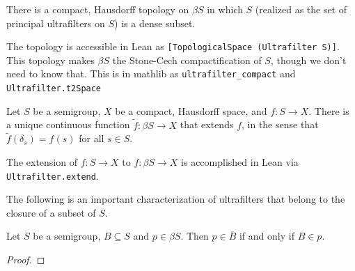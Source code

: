 \begin{definition}
\label{def_cmpt_hausdorff_top_on_ultra}
\mathlibok
    There is a compact, Hausdorff topology on $\beta S$ in which $S$ (realized as the set of principal ultrafilters on $S$) is a dense subset.  
\end{definition}

\begin{leanrmk}
    The topology is accessible in Lean as \verb|[TopologicalSpace (Ultrafilter S)]|.  This topology makes $\beta S$ the Stone-Cech compactification of $S$, though we don't need to know that.  This is in mathlib as \verb|ultrafilter_compact| and \verb|Ultrafilter.t2Space|
\end{leanrmk}

\begin{theorem}
\label{thm_cts_extend}
\mathlibok
    Let $S$ be a semigroup, $X$ be a compact, Hausdorff space, and $f: S \to X$.  There is a unique continuous function $\tilde f: \beta S \to X$ that extends $f$, in the sense that $\tilde f (\delta_s) = f(s)$ for all $s \in S$.
\end{theorem}

\begin{leanrmk}
    The extension of $f: S \to X$ to $f: \beta S \to X$ is accomplished in Lean via \verb|Ultrafilter.extend|.
\end{leanrmk}


The following is an important characterization of ultrafilters that belong to the closure of a subset of $S$.
\begin{lemma}
\label{lem:characterization_mem_closure_pure}
\leanok{}
Let $S$ be a semigroup, $B \subseteq S$ and $p \in \beta S$. Then $p \in \overline{B}$ if and only if $B \in p$.
\end{lemma}
\begin{proof}
\leanok{}
\end{proof}

